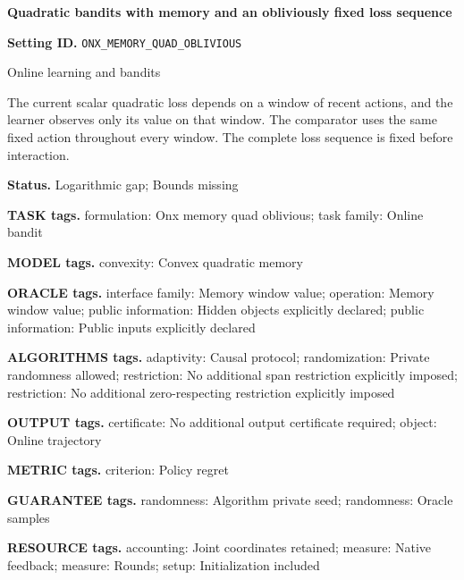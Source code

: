 \documentclass[10pt,a4paper]{article}
\begin{document}
\raggedright

{\LARGE\bfseries\sffamily\color{AtlasNavy} Quadratic bandits with memory and an obliviously fixed loss sequence\par}\vspace{5pt}


\textbf{Setting ID.} \texttt{ONX\_\allowbreak{}MEMORY\_\allowbreak{}QUAD\_\allowbreak{}OBLIVIOUS}



Online learning and bandits



The current scalar quadratic loss depends on a window of recent actions, and the learner observes only its value on that window. The comparator uses the same fixed action throughout every window. The complete loss sequence is fixed before interaction.



\textbf{Status.} Logarithmic gap; Bounds missing



\textbf{TASK tags.} formulation: Onx memory quad oblivious; task family: Online bandit



\textbf{MODEL tags.} convexity: Convex quadratic memory



\textbf{ORACLE tags.} interface family: Memory window value; operation: Memory window value; public information: Hidden objects explicitly declared; public information: Public inputs explicitly declared



\textbf{ALGORITHMS tags.} adaptivity: Causal protocol; randomization: Private randomness allowed; restriction: No additional span restriction explicitly imposed; restriction: No additional zero-respecting restriction explicitly imposed



\textbf{OUTPUT tags.} certificate: No additional output certificate required; object: Online trajectory



\textbf{METRIC tags.} criterion: Policy regret



\textbf{GUARANTEE tags.} randomness: Algorithm private seed; randomness: Oracle samples



\textbf{RESOURCE tags.} accounting: Joint coordinates retained; measure: Native feedback; measure: Rounds; setup: Initialization included
\end{document}

